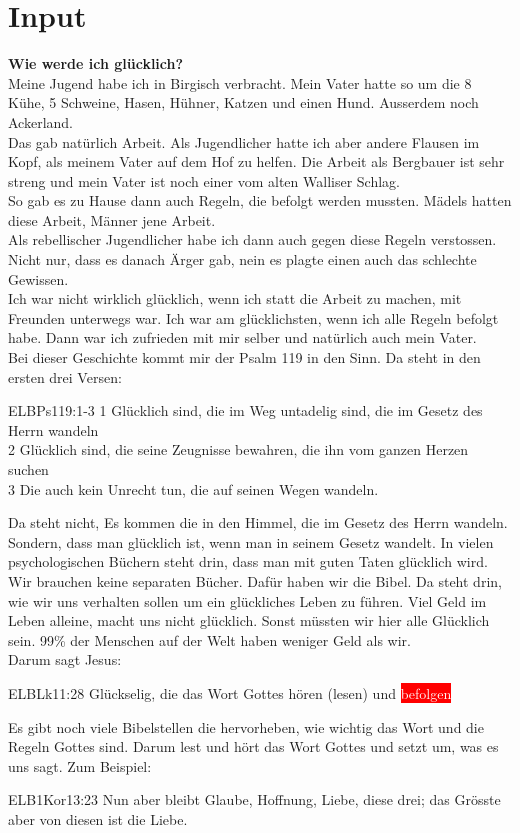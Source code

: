 \documentclass{../inc/mybib}
\begin{document}
\section{ Input }
\begin{spacing}{1.5}
\textbf{Wie werde ich glücklich?}\\
Meine Jugend habe ich in Birgisch verbracht. Mein Vater hatte so um die 8 Kühe, 5 Schweine, Hasen, Hühner, Katzen und einen Hund. Ausserdem noch Ackerland.\\
Das gab natürlich Arbeit. Als Jugendlicher hatte ich aber andere Flausen im Kopf, als meinem Vater auf dem Hof zu helfen. Die Arbeit als Bergbauer ist sehr streng und mein Vater ist noch einer vom alten Walliser Schlag.\\ So gab es zu Hause dann auch Regeln, die befolgt werden mussten. Mädels hatten diese Arbeit, Männer jene Arbeit.\\
Als rebellischer Jugendlicher habe ich dann auch gegen diese Regeln verstossen. Nicht nur, dass es danach Ärger gab, nein es plagte einen auch das schlechte Gewissen.\\ Ich war nicht wirklich glücklich, wenn ich statt die Arbeit zu machen, mit Freunden unterwegs war. Ich war am glücklichsten, wenn ich alle Regeln befolgt habe. Dann war ich zufrieden mit mir selber und natürlich auch mein Vater.\\
Bei dieser Geschichte kommt mir der Psalm 119 in den Sinn. Da steht in den ersten drei Versen:
\begin{bibelbox}{ELB}{Ps}{119:1-3}
1 Glücklich sind, die im Weg untadelig sind, die im Gesetz des Herrn wandeln\\
2 Glücklich sind, die seine Zeugnisse bewahren, die ihn vom ganzen Herzen suchen\\
3 Die auch kein Unrecht tun, die auf seinen Wegen wandeln.
\end{bibelbox}
Da steht nicht, \grqq Es kommen die in den Himmel, die im Gesetz des Herrn wandeln. \glqq{} Sondern, dass man glücklich ist, wenn man in seinem Gesetz wandelt. In vielen psychologischen Büchern steht drin, dass man mit guten Taten glücklich wird.\\
Wir brauchen keine separaten Bücher. Dafür haben wir die Bibel. Da steht drin, wie wir uns verhalten sollen um ein glückliches Leben zu führen. Viel Geld im Leben alleine, macht uns nicht glücklich. Sonst müssten wir hier alle Glücklich sein. 99\% der Menschen auf der Welt haben weniger Geld als wir.\\
Darum sagt Jesus:
\begin{bibelbox}{ELB}{Lk}{11:28}
Glückselig, die das Wort Gottes hören (lesen) und \colorbox{red}{\textcolor{white}{befolgen}}
\end{bibelbox}
Es gibt noch viele Bibelstellen die hervorheben, wie wichtig das Wort und die Regeln Gottes sind. Darum lest und hört das Wort Gottes und setzt um, was es uns sagt.
Zum Beispiel:
\begin{bibelbox}{ELB}{1Kor}{13:23}
Nun aber bleibt Glaube, Hoffnung, Liebe, diese drei; das Grösste aber von diesen ist die Liebe.
\end{bibelbox}


\end{spacing}
\end{document}
